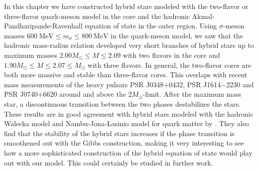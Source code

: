 In this chapter we have constructed hybrid stars modeled with the two-flavor or three-flavor quark-meson model in the core
and the hadronic Akmal-Pandharipande-Ravenhall equation of state in the outer region.
Using $\sigma$-meson masses $\SI{600}{\mega\electronvolt} \leq m_\sigma \leq \SI{800}{\mega\electronvolt}$ in the quark-meson model,
we saw that the hadronic mass-radius relation developed very short branches of hybrid stars
up to maximum masses $2.00 M_\odot \leq M \leq 2.09$ with two flavors in the core
and $1.90 M_\odot \leq M \leq 2.07 \leq M_\odot$ with three flavors.
In general, the two-flavor cores are both more massive and stable than three-flavor cores.
This overlaps with recent mass measurements of the heavy pulsars PSR J0348$+$0432, PSR J1614$-$2230 and PSR J0740$+$6620 around and above the $2 M_\odot$-limit.
After the maximum mass star, a discontinuous transition between the two phases destabilizes the stars.
These results are in good agreement with hybrid stars modeled with the hadronic Walecka model and Nambu-Jona-Lasinio model for quark matter by \cite{ref:hybrid_stars_njl}.
They also find that the stability of the hybrid stars increases if the phase transition is smoothened out with the Gibbs construction,
making it very interesting to see how a more sophisticated construction of the hybrid equation of state would play out with our model.
This could certainly be studied in further work.
